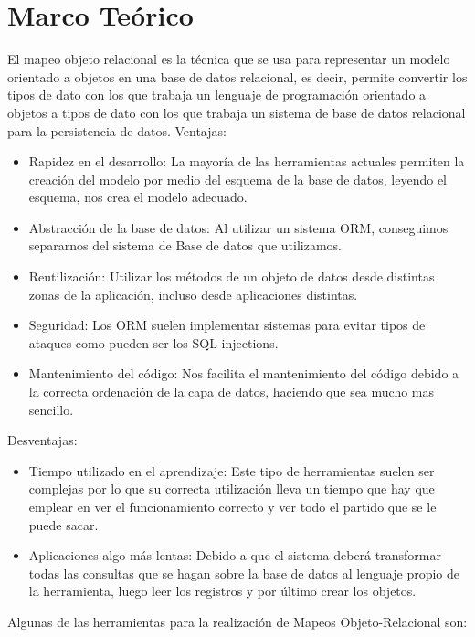 \documentclass[%
 reprint,
 amsmath,amssymb,
 aps,
]{revtex4-1}
\begin{document}
\section {Marco Teórico}\label{sec:3}
El mapeo objeto relacional es la técnica que se usa para representar un modelo orientado a objetos en una base de datos relacional, es decir, permite convertir los tipos de dato con los que trabaja un lenguaje de programación orientado a objetos a tipos de dato con los que trabaja un sistema de base de datos relacional para la persistencia de datos.
\newline
Ventajas:
\begin{itemize}
	\item Rapidez en el desarrollo: La mayoría de las herramientas actuales permiten la creación del modelo por medio del esquema de la base de datos, leyendo el esquema, nos crea el modelo adecuado.
	\item Abstracción de la base de datos: Al utilizar un sistema ORM, conseguimos separarnos del sistema de Base de datos que utilizamos.
	\item Reutilización: Utilizar los métodos de un objeto de datos desde distintas zonas de la aplicación, incluso desde aplicaciones distintas.
	\item Seguridad: Los ORM suelen implementar sistemas para evitar tipos de ataques como pueden ser los SQL injections.
	\item Mantenimiento del código: Nos facilita el mantenimiento del código debido a la correcta ordenación de la capa de datos, haciendo que sea mucho mas sencillo.
\end{itemize}
Desventajas:
\begin{itemize}
	\item Tiempo utilizado en el aprendizaje: Este tipo de herramientas suelen ser complejas por lo que su correcta utilización lleva un tiempo que hay que emplear en ver el funcionamiento correcto y ver todo el partido que se le puede sacar.
	\item Aplicaciones algo más lentas: Debido a que el sistema deberá transformar todas las consultas que se hagan sobre la base de datos al lenguaje propio de la herramienta, luego leer los registros y por último crear los objetos.
\end{itemize}

Algunas de las herramientas para la realización de Mapeos Objeto-Relacional son:
\end{document}
